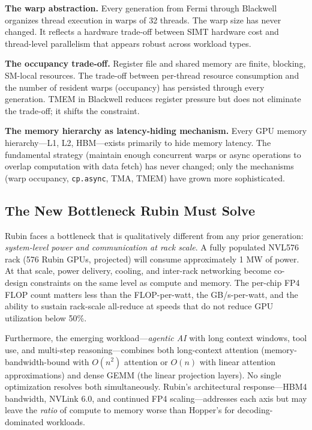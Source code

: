 \documentclass[10pt,twocolumn]{article}
\begin{document}
\textbf{The warp abstraction.} Every generation from Fermi through Blackwell organizes thread execution in warps of 32 threads. The warp size has never changed. It reflects a hardware trade-off between SIMT hardware cost and thread-level parallelism that appears robust across workload types.

\textbf{The occupancy trade-off.} Register file and shared memory are finite, blocking, SM-local resources. The trade-off between per-thread resource consumption and the number of resident warps (occupancy) has persisted through every generation. TMEM in Blackwell reduces register pressure but does not eliminate the trade-off; it shifts the constraint.

\textbf{The memory hierarchy as latency-hiding mechanism.} Every GPU memory hierarchy—L1, L2, HBM—exists primarily to hide memory latency. The fundamental strategy (maintain enough concurrent warps or async operations to overlap computation with data fetch) has never changed; only the mechanisms (warp occupancy, \texttt{cp.async}, TMA, TMEM) have grown more sophisticated.

\subsection{The New Bottleneck Rubin Must Solve}

Rubin faces a bottleneck that is qualitatively different from any prior generation: \textit{system-level power and communication at rack scale}. A fully populated NVL576 rack (576 Rubin GPUs, projected) will consume approximately 1 MW of power. At that scale, power delivery, cooling, and inter-rack networking become co-design constraints on the same level as compute and memory. The per-chip FP4 FLOP count matters less than the FLOP-per-watt, the GB/s-per-watt, and the ability to sustain rack-scale all-reduce at speeds that do not reduce GPU utilization below 50\%.

Furthermore, the emerging workload—\textit{agentic AI} with long context windows, tool use, and multi-step reasoning—combines both long-context attention (memory-bandwidth-bound with $O(n^2)$ attention or $O(n)$ with linear attention approximations) and dense GEMM (the linear projection layers). No single optimization resolves both simultaneously. Rubin's architectural response—HBM4 bandwidth, NVLink 6.0, and continued FP4 scaling—addresses each axis but may leave the \textit{ratio} of compute to memory worse than Hopper's for decoding-dominated workloads.
\end{document}
